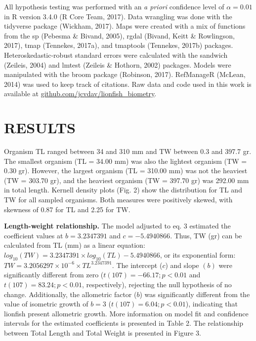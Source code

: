 \documentclass[12pt,]{article}
\begin{document}
All hypothesis testing was performed with an \emph{a priori} confidence
level of \(\alpha = 0.01\) in R version 3.4.0 (R Core Team, 2017). Data
wrangling was done with the tidyverse package (Wickham, 2017). Maps were
created with a mix of functions from the sp (Pebesma \& Bivand, 2005),
rgdal (Bivand, Keitt \& Rowlingson, 2017), tmap (Tennekes, 2017a), and
tmaptools (Tennekes, 2017b) packages. Heteroskedastic-robust standard
errors were calculated with the sandwich (Zeileis, 2004) and lmtest
(Zeileis \& Hothorn, 2002) packages. Models were manipulated with the
broom package (Robinson, 2017). RefManageR (McLean, 2014) was used to
keep track of citations. Raw data and code used in this work is
available at \url{github.com/jcvdav/lionfish_biometry}.

\section{RESULTS}\label{results}

Organism TL ranged between 34 and 310 mm and TW between 0.3 and 397.7
gr. The smallest organism (TL = 34.00 mm) was also the lightest organism
(TW = 0.30 gr). However, the largest organism (TL = 310.00 mm) was not
the heaviest (TW = 303.70 gr), and the heaviest organism (TW = 397.70
gr) was 292.00 mm in total length. Kernell density plots (Fig. 2) show
the distribution for TL and TW for all sampled organisms. Both measures
were positively skewed, with skewness of 0.87 for TL and 2.25 for TW.

\textbf{Length-weight relationship.} The model adjusted to eq. 3
estimated the coefficient values at \(b = 3.2347391\) and
\(c = -5.4940866\). Thus, TW (gr) can be calculated from TL (mm) as a
linear equation:
\(log_{10}(TW) = 3.2347391\times log_{10}(TL) -5.4940866\), or its
exponential form: \(TW = 3.2056297\times 10^{-6}\times TL^{3.2347391}\).
The intercept (\(c\)) and slope \((b)\) were significantly different
from zero (\(t(107) = -66.17; p<0.01\) and \(t(107) = 83.24; p<0.01\),
respectively), rejecting the null hypothesis of no change. Additionally,
the allometric factor (\(b\)) was significantly different from the value
of isometric growth of \(b = 3\) (\(t(107) = 6.04; p<0.01\)), indicating
that lionfish present allometric growth. More information on model fit
and confidence intervals for the estimated coefficients is presented in
Table 2. The relationship between Total Length and Total Weight is
presented in Figure 3.
\end{document}
